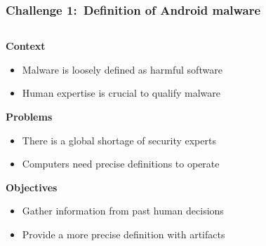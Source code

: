 \begin{frame}
    \frametitle{Challenge 1:~Definition of Android malware}

    \begin{columns}
        \begin{column}{0.8\textwidth}
            \begin{block}{}
                \centering
                \textbf{Context}
            \end{block}
            \begin{itemize}
                \item Malware is loosely defined as harmful software
                \item Human expertise is crucial to qualify malware
            \end{itemize}

            \begin{block}{}
                \centering
                \textbf{Problems}
            \end{block}
            \begin{itemize}
                \item There is a global shortage of security experts
                \item Computers need precise definitions to operate
            \end{itemize}

            \begin{block}{}
                \centering
                \textbf{Objectives}
            \end{block}
            \begin{itemize}
                \item Gather information from past human decisions
                \item Provide a more precise definition with artifacts
            \end{itemize}
        \end{column}


\end{columns}
\end{frame}
